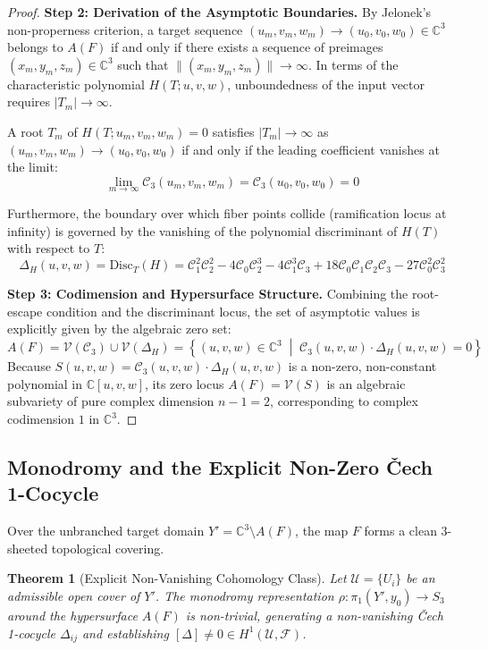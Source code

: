 \documentclass[11pt,reqno]{amsart}
\newtheorem{theorem}{Theorem}[section]
\theoremstyle{definition}
\begin{document}
\begin{proof}
\textbf{Step 2: Derivation of the Asymptotic Boundaries.}
By Jelonek's non-properness criterion, a target sequence $(u_m, v_m, w_m) \to (u_0, v_0, w_0) \in \mathbb{C}^3$ belongs to $A(F)$ if and only if there exists a sequence of preimages $(x_m, y_m, z_m) \in \mathbb{C}^3$ such that $\|(x_m, y_m, z_m)\| \to \infty$. In terms of the characteristic polynomial $H(T; u,v,w)$, unboundedness of the input vector requires $|T_m| \to \infty$.

A root $T_m$ of $H(T; u_m, v_m, w_m) = 0$ satisfies $|T_m| \to \infty$ as $(u_m, v_m, w_m) \to (u_0, v_0, w_0)$ if and only if the leading coefficient vanishes at the limit:
$$\lim_{m \to \infty} \mathcal{C}_3(u_m, v_m, w_m) = \mathcal{C}_3(u_0, v_0, w_0) = 0$$

Furthermore, the boundary over which fiber points collide (ramification locus at infinity) is governed by the vanishing of the polynomial discriminant of $H(T)$ with respect to $T$:
$$\Delta_H(u,v,w) = \mathrm{Disc}_T(H) = \mathcal{C}_1^2 \mathcal{C}_2^2 - 4 \mathcal{C}_0 \mathcal{C}_2^3 - 4 \mathcal{C}_1^3 \mathcal{C}_3 + 18 \mathcal{C}_0 \mathcal{C}_1 \mathcal{C}_2 \mathcal{C}_3 - 27 \mathcal{C}_0^2 \mathcal{C}_3^2$$

\textbf{Step 3: Codimension and Hypersurface Structure.}
Combining the root-escape condition and the discriminant locus, the set of asymptotic values is explicitly given by the algebraic zero set:
$$A(F) = \mathcal{V}(\mathcal{C}_3) \cup \mathcal{V}(\Delta_H) = \left\{ (u,v,w) \in \mathbb{C}^3 \;\middle|\; \mathcal{C}_3(u,v,w) \cdot \Delta_H(u,v,w) = 0 \right\}$$
Because $S(u,v,w) = \mathcal{C}_3(u,v,w) \cdot \Delta_H(u,v,w)$ is a non-zero, non-constant polynomial in $\mathbb{C}[u,v,w]$, its zero locus $A(F) = \mathcal{V}(S)$ is an algebraic subvariety of pure complex dimension $n-1 = 2$, corresponding to complex codimension $1$ in $\mathbb{C}^3$.
\end{proof}

\subsection{Monodromy and the Explicit Non-Zero \v{C}ech 1-Cocycle}
Over the unbranched target domain $Y' = \mathbb{C}^3 \setminus A(F)$, the map $F$ forms a clean $3$-sheeted topological covering. 

\begin{theorem}[Explicit Non-Vanishing Cohomology Class]
Let $\mathcal{U} = \{U_i\}$ be an admissible open cover of $Y'$. The monodromy representation $\rho: \pi_1(Y', y_0) \to S_3$ around the hypersurface $A(F)$ is non-trivial, generating a non-vanishing \v{C}ech 1-cocycle $\Delta_{ij}$ and establishing $[\Delta] \neq 0 \in H^1(\mathcal{U}, \mathcal{F})$.
\end{theorem}
\end{document}
